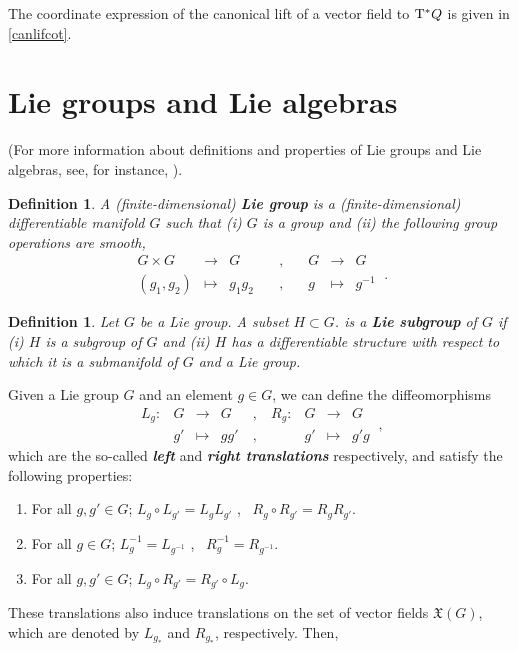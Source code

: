 \documentclass[12pt]{report}
\newtheorem{definition}[teor]{Definition}
\def\vf{\mathfrak X}
\def\Tan{{\rm T}}
\begin{document}
\begin{appendix}
The coordinate expression of the canonical lift of a vector field to $\Tan^*Q$ is given in \eqref{canlifcot}.



\section{Lie groups and Lie algebras}
\label{Liega}


(For more information about definitions and properties of Lie groups and Lie algebras, see,
for instance, \cite{Ar-89,CP-adg,Ok-87,To-65,Wa-fsmlg}).

\begin{definition}
A (finite-dimensional) \textbf{Lie group}
is a (finite-dimensional) differentiable manifold $G$ such that
{\rm (i)}
$G$ is a group and
{\rm (ii)}
the following group operations are smooth,
$$
\begin{array}{ccccccc}
G \times G &\to& G & \quad , \quad & G &\to& G
\\
(g_1,g_2) &\mapsto& g_1g_2 & \quad , \quad & g &\mapsto& g^{-1}
\end{array} \ .
$$
\end{definition}

\begin{definition}
Let $G$ be a Lie group. A subset $H \subset G$.
is a \textbf{Lie subgroup} of $G$ if
{\rm (i)} $H$ is a subgroup of $G$ and
{\rm (ii)} $H$ has a differentiable structure with respect
to which it is a submanifold of $G$ and a Lie group.
\end{definition}

Given a Lie group $G$ and an element $g \in G$,
we can define the diffeomorphisms
$$
\begin{array}{ccccccccc}
L_g \colon & G & \to & G & \ , \ & R_g \colon & G & \to & G
\\
& g' & \mapsto & gg' & \ , \ & &  g' & \mapsto & g'g
\end{array} \ ,
$$
which are the so-called {\sl \textbf{left}} and {\sl \textbf{right translations}}
respectively, and satisfy the following properties:
\begin{enumerate}
\item
For all $g,g' \in G$;\quad
$L_g \circ L_{g'} = L_gL_{g'}$ , \ 
$R_g \circ R_{g'} = R_gR_{g'}$.
\item
For all $g \in G$;\quad
$L_g^{-1} = L_{g^{-1}}$ , \
$R_g^{-1} = R_{g^{-1}}$.
\item
For all $g,g' \in G$;
$L_g \circ R_{g'} = R_{g'} \circ L_g$.
\end{enumerate}
These translations also induce translations on the set of
vector fields $\vf(G)$, which are denoted by
$L_{g_*}$ and $R_{g_*}$, respectively. Then, 


\end{appendix}
\end{document}
